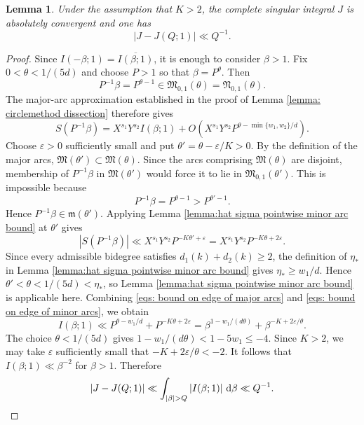 \documentclass[12pt,reqno]{amsart}
\newtheorem{lemma}[theorem]{Lemma}
\theoremstyle{definition}
\theoremstyle{remark}
\numberwithin{equation}{section}
\def\grm{{\mathfrak m}}\def\grM{{\mathfrak M}}
\def\grN{{\mathfrak N}}\def\grn{{\mathfrak n}}
\def\b{{\beta}}  \def\bfbet{{\boldsymbol \beta}}
\def\eps{\varepsilon}
\def\d{{\,{\rm d}}}
\begin{document}
\begin{lemma}\label{lemma: complete singular integral}
    Under the assumption that $K > 2$, the complete singular integral $J$ is absolutely convergent and one has
    \[|J - J(Q;1)| \ll Q^{-1}.\]
\end{lemma}
\begin{proof}
    Since $I(-\b;1)=\overline{I(\b;1)}$, it is enough to consider
    $\b>1$.  Fix $0<\theta<1/(5d)$ and choose $P>1$ so that
    $\b=P^\theta$.  Then
    \[
        P^{-1}\b=P^{\theta-1}
        \in\grM_{0,1}(\theta)=\grN_{0,1}(\theta).
    \]
    The major-arc approximation established in the proof of Lemma
    \ref{lemma: circlemethod dissection} therefore gives
    \begin{equation}\label{eqs: bound on edge of major arcs}
        S(P^{-1}\b) = X^{s_1}Y^{s_2}I(\b;1) + O\left(X^{s_1}Y^{s_2}P^{\theta-\min\{w_1,w_2\}/d} \right).
    \end{equation}
    Choose $\eps>0$ sufficiently small and put
    $\theta'=\theta-\eps/K>0$.  By the definition of the major arcs,
    $\grM(\theta')\subset\grM(\theta)$.  Since the arcs comprising
    $\grM(\theta)$ are disjoint, membership of $P^{-1}\b$ in
    $\grM(\theta')$ would force it to lie in
    $\grM_{0,1}(\theta')$.  This is impossible because
    \[
        P^{-1}\b=P^{\theta-1}>P^{\theta'-1}.
    \]
    Hence $P^{-1}\b\in\grm(\theta')$.  Applying Lemma
    \ref{lemma:hat sigma pointwise minor arc bound} at $\theta'$ gives
    \begin{equation}\label{eqs: bound on edge of minor arcs}
        |S(P^{-1}\b)|
        \ll X^{s_1}Y^{s_2}P^{-K\theta'+\eps}
        =X^{s_1}Y^{s_2}P^{-K\theta+2\eps}.
    \end{equation}
    Since every admissible bidegree satisfies
    $d_1(k)+d_2(k)\geq2$, the definition of $\eta_*$ in Lemma
    \ref{lemma:hat sigma pointwise minor arc bound} gives
    $\eta_*\geq w_1/d$.  Hence
    $\theta'<\theta<1/(5d)<\eta_*$, so Lemma
    \ref{lemma:hat sigma pointwise minor arc bound} is applicable here.
    Combining \eqref{eqs: bound on edge of major arcs} and
    \eqref{eqs: bound on edge of minor arcs}, we obtain
    \[
        I(\b;1)
        \ll P^{\theta-w_1/d}+P^{-K\theta+2\eps}
        =\b^{1-w_1/(d\theta)}
        +\b^{-K+2\eps/\theta}.
    \]
    The choice $\theta<1/(5d)$ gives
    $1-w_1/(d\theta)<1-5w_1\leq-4$.  Since $K>2$, we may take
    $\eps$ sufficiently small that $-K+2\eps/\theta<-2$.  It follows
    that $I(\b;1)\ll\b^{-2}$ for $\b>1$.  Therefore
    \[
        |J-J(Q;1)|
        \ll\int_{|\b|>Q}|I(\b;1)|\,\d\b
        \ll Q^{-1}.
    \]
\end{proof}
\end{document}
